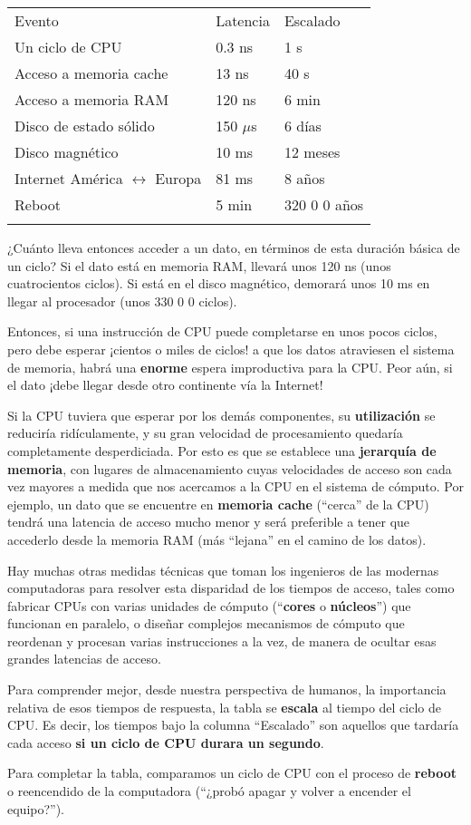 \documentclass[spanish,A4,]{article}
\begin{document}
\begin{longtable}[c]{@{}lll@{}}
\toprule\addlinespace
Evento & Latencia & Escalado
\\\addlinespace
\midrule\endhead
Un ciclo de CPU & 0.3 ns & 1 s
\\\addlinespace
Acceso a memoria cache & 13 ns & 40 s
\\\addlinespace
Acceso a memoria RAM & 120 ns & 6 min
\\\addlinespace
Disco de estado sólido & 150 $\mu$s & 6 días
\\\addlinespace
Disco magnético & 10 ms & 12 meses
\\\addlinespace
Internet América $\longleftrightarrow$ Europa & 81 ms & 8 años
\\\addlinespace
Reboot & 5 min & 320 0 0 años
\\\addlinespace
\bottomrule
\end{longtable}

¿Cuánto lleva entonces acceder a un dato, en términos de esta duración
básica de un ciclo? Si el dato está en memoria RAM, llevará unos 120 ns
(unos cuatrocientos ciclos). Si está en el disco magnético, demorará
unos 10 ms en llegar al procesador (unos 330 0 0 ciclos).

Entonces, si una instrucción de CPU puede completarse en unos pocos
ciclos, pero debe esperar ¡cientos o miles de ciclos! a que los datos
atraviesen el sistema de memoria, habrá una \textbf{enorme} espera
improductiva para la CPU. Peor aún, si el dato ¡debe llegar desde otro
continente vía la Internet!

Si la CPU tuviera que esperar por los demás componentes, su
\textbf{utilización} se reduciría ridículamente, y su gran velocidad de
procesamiento quedaría completamente desperdiciada. Por esto es que se
establece una \textbf{jerarquía de memoria}, con lugares de
almacenamiento cuyas velocidades de acceso son cada vez mayores a medida
que nos acercamos a la CPU en el sistema de cómputo. Por ejemplo, un
dato que se encuentre en \textbf{memoria cache} (``cerca'' de la CPU)
tendrá una latencia de acceso mucho menor y será preferible a tener que
accederlo desde la memoria RAM (más ``lejana'' en el camino de los
datos).

Hay muchas otras medidas técnicas que toman los ingenieros de las
modernas computadoras para resolver esta disparidad de los tiempos de
acceso, tales como fabricar CPUs con varias unidades de cómputo
(``\textbf{cores} o \textbf{núcleos}'') que funcionan en paralelo, o
diseñar complejos mecanismos de cómputo que reordenan y procesan varias
instrucciones a la vez, de manera de ocultar esas grandes latencias de
acceso.

Para comprender mejor, desde nuestra perspectiva de humanos, la
importancia relativa de esos tiempos de respuesta, la tabla se
\textbf{escala} al tiempo del ciclo de CPU. Es decir, los tiempos bajo
la columna ``Escalado'' son aquellos que tardaría cada acceso \textbf{si
un ciclo de CPU durara un segundo}.

Para completar la tabla, comparamos un ciclo de CPU con el proceso de
\textbf{reboot} o reencendido de la computadora (``¿probó apagar y
volver a encender el equipo?'').
\end{document}
